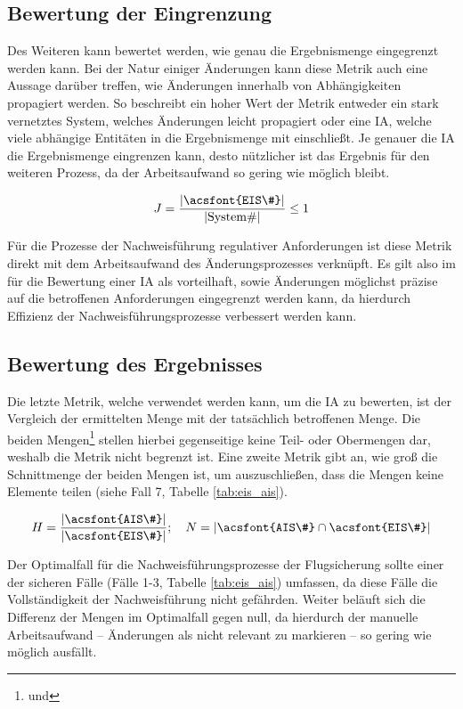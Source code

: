 \pagebreak
\subsection{Bewertung der Eingrenzung}
    
    Des Weiteren kann bewertet werden, wie genau die Ergebnismenge eingegrenzt werden kann.
    Bei der Natur einiger Änderungen kann diese Metrik auch eine Aussage darüber treffen, wie Änderungen innerhalb von Abhängigkeiten propagiert werden. 
    So beschreibt ein hoher Wert der Metrik entweder ein stark vernetztes System, welches Änderungen leicht propagiert oder eine \ac{IA}, welche viele abhängige Entitäten in die Ergebnismenge mit einschließt.
    Je genauer die \ac{IA} die Ergebnismenge eingrenzen kann, desto nützlicher ist das Ergebnis für den weiteren Prozess, da der Arbeitsaufwand so gering wie möglich bleibt. 
    
    $$
        J = \dfrac{|\text{\acsfont{EIS\#}}|}{|\text{System\#}|} \leq 1
    $$

    \noindent
    Für die Prozesse der Nachweisführung regulativer Anforderungen ist diese Metrik direkt mit dem Arbeitsaufwand des Änderungsprozesses verknüpft.
    Es gilt also im für die Bewertung einer \ac{IA} als vorteilhaft, sowie Änderungen möglichst präzise auf die betroffenen Anforderungen eingegrenzt werden kann, da hierdurch Effizienz der Nachweisführungsprozesse verbessert werden kann.
    
    

\subsection{Bewertung des Ergebnisses}
    
    Die letzte Metrik, welche verwendet werden kann, um die \ac{IA} zu bewerten, ist der Vergleich der ermittelten Menge mit der tatsächlich betroffenen Menge.
    Die beiden Mengen\footnote{ und } stellen hierbei gegenseitige keine Teil- oder Obermengen dar, weshalb die Metrik nicht begrenzt ist.
    Eine zweite Metrik gibt an, wie groß die Schnittmenge der beiden Mengen ist, um auszuschließen, dass die Mengen keine Elemente teilen (siehe Fall 7, Tabelle \ref{tab:eis_ais}). 
    
    $$
        H = \dfrac{|\text{\acsfont{AIS\#}}|}{|\text{\acsfont{EIS\#}}|}; \quad
        N = |\acsfont{AIS\#} \cap \acsfont{EIS\#}|
    $$
    
    Der Optimalfall für die Nachweisführungsprozesse der Flugsicherung sollte einer der sicheren Fälle (Fälle 1-3, Tabelle \ref{tab:eis_ais}) umfassen, da diese Fälle die Vollständigkeit der Nachweisführung nicht gefährden.
    Weiter beläuft sich die Differenz der Mengen im Optimalfall gegen null, da hierdurch der manuelle Arbeitsaufwand -- Änderungen als nicht relevant zu markieren -- so gering wie möglich ausfällt.
    \bigskip
    
    
